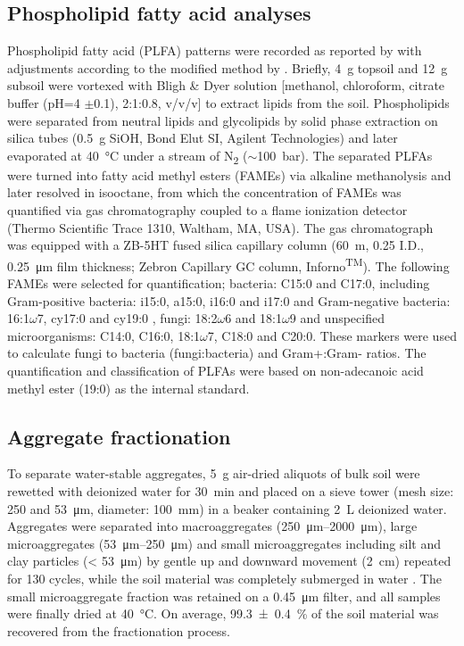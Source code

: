 \subsection{Phospholipid fatty acid analyses}

Phospholipid fatty acid (PLFA) patterns were recorded as reported by \citet{Frostegard1993} with adjustments according to the modified method by \citet{Kramer2013}. Briefly, \SI{4}{\gram} topsoil and \SI{12}{\gram} subsoil were vortexed with Bligh \& Dyer solution [methanol, chloroform, citrate buffer (pH=4 \(\pm\)0.1), 2:1:0.8, v/v/v] to extract lipids from the soil. Phospholipids were separated from neutral lipids and glycolipids by solid phase extraction on silica tubes (\SI{0.5}{\gram} SiOH, Bond Elut SI, Agilent Technologies) and later evaporated at \SI{40}{\degreeCelsius} under a stream of N\textsubscript{2} (\(\sim\)\SI{100}{bar}). The separated PLFAs were turned into fatty acid methyl esters (FAMEs) via alkaline methanolysis and later resolved in isooctane, from which the concentration of FAMEs was quantified via gas chromatography coupled to a flame ionization detector (Thermo Scientific Trace 1310, Waltham, MA, USA). The gas chromatograph was equipped with a ZB-5HT fused silica capillary column (\SI{60}{\metre}, 0.25 I.D., \SI{0.25}{\micro\metre} film thickness; Zebron Capillary GC column, Inforno\textsuperscript{TM}). The following FAMEs were selected for quantification; bacteria: C15:0 and C17:0, including Gram-positive bacteria: i15:0, a15:0, i16:0 and i17:0 \citep{OLeary1988} and Gram-negative bacteria: 16:1\(\omega\)7, cy17:0 and cy19:0 \citep{Phillips2002}, fungi: 18:2\(\omega\)6 and 18:1\(\omega\)9 and unspecified microorganisms: C14:0, C16:0, 18:1\(\omega\)7, C18:0 and C20:0. These markers were used to calculate fungi to bacteria (fungi:bacteria) and Gram+:Gram- ratios. 
The quantification and classification of PLFAs were based on non-adecanoic acid methyl ester (19:0) as the internal standard.

\subsection{Aggregate fractionation}

To separate water-stable aggregates, \SI{5}{\gram} air-dried aliquots of bulk soil were rewetted with deionized water for \SI{30}{\minute} and placed on a sieve tower (mesh size: \num{250} and \SI{53}{\micro\metre}, diameter: \SI{100}{\milli\metre}) in a beaker containing \SI{2}{\liter} deionized water. Aggregates were separated into macroaggregates (\SIrange{250}{2000}{\micro\metre}), large microaggregates (\SIrange{53}{250}{\micro\metre}) and small microaggregates including silt and clay particles (\SI{< 53}{\micro\metre}) by gentle up and downward movement (\SI{2}{\centi\metre}) repeated for 130 cycles, while the soil material was completely submerged in water \citep{Baumert2018}. The small microaggregate fraction was retained on a \SI{0.45}{\micro\metre} filter, and all samples were finally dried at \SI{40}{\degreeCelsius}. On average, \SI{99.3 \pm 0.4}{\percent} of the soil material was recovered from the fractionation process.

